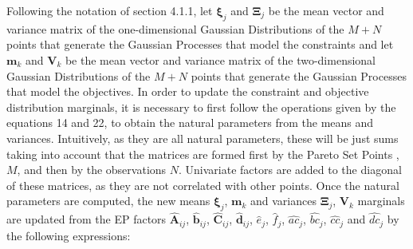 Following the notation of section 4.1.1, let $\boldsymbol{\xi}_j$ and $\boldsymbol{\Xi}_j$ be the mean vector and variance matrix of the one-dimensional Gaussian Distributions of the $M+N$ points that generate the Gaussian Processes that model the constraints and let $\boldsymbol{m}_{k}$ and $\boldsymbol{V}_{k}$ be the mean vector and variance matrix of the two-dimensional Gaussian Distributions of the $M+N$ points that generate the Gaussian Processes that model the objectives. In order to update the constraint and objective distribution marginals, it is necessary to first follow the operations given by the equations 14 and 22, to obtain the natural parameters from the means and variances. Intuitively, as they are all natural parameters, these will be just sums taking into account that the matrices are formed first by the Pareto Set Points ,$M$, and then by the observations $N$. Univariate factors are added to the diagonal of these matrices, as they are not correlated with other points. Once the natural parameters are computed, the new means $\boldsymbol{\xi}_j$, $\boldsymbol{m}_{k}$ and variances $\boldsymbol{\Xi}_j$, $\boldsymbol{V}_{k}$ marginals are updated from the EP factors $\hat{\boldsymbol{A}}_{ij}$, $\hat{\boldsymbol{b}}_{ij}$, $\hat{\boldsymbol{C}}_{ij}$, $\hat{\boldsymbol{d}}_{ij}$, $\hat{e}_{j}$, $\hat{f}_{j}$, $\hat{ac}_j$, $\hat{bc}_j$, $\hat{cc}_j$ and $\hat{dc}_j$ by the following expressions:

